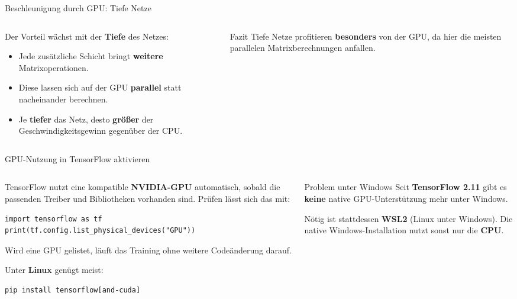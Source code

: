 \begin{frame}{Beschleunigung durch GPU: Tiefe Netze}
\begin{columns}
\begin{column}{0.60\textwidth}
Der Vorteil wächst mit der \textbf{Tiefe} des Netzes:
\begin{itemize}
\item Jede zusätzliche Schicht bringt \textbf{weitere} Matrixoperationen.
\item Diese lassen sich auf der GPU \textbf{parallel} statt nacheinander berechnen.
\item Je \textbf{tiefer} das Netz, desto \textbf{größer} der Geschwindigkeitsgewinn gegenüber der CPU.
\end{itemize}
\end{column}
\begin{column}{0.35\textwidth}
\begin{block}{Fazit}
Tiefe Netze profitieren \textbf{besonders} von der GPU, da hier die meisten parallelen Matrixberechnungen anfallen.
\end{block}
\end{column}
\end{columns}
\end{frame}


\begin{frame}[fragile]{GPU-Nutzung in TensorFlow aktivieren}
\begin{columns}
\begin{column}{0.55\textwidth}
TensorFlow nutzt eine kompatible \textbf{NVIDIA-GPU} automatisch, sobald die passenden Treiber und Bibliotheken vorhanden sind. Prüfen lässt sich das mit:
\begin{verbatim}
import tensorflow as tf
print(tf.config.list_physical_devices("GPU"))
\end{verbatim}
Wird eine GPU gelistet, läuft das Training ohne weitere Codeänderung darauf.

\vspace{0.3em}
Unter \textbf{Linux} genügt meist:
\begin{verbatim}
pip install tensorflow[and-cuda]
\end{verbatim}
\end{column}
\begin{column}{0.40\textwidth}
\begin{alertblock}{Problem unter Windows}
Seit \textbf{TensorFlow 2.11} gibt es \textbf{keine} native GPU-Unterstützung mehr unter Windows.
\end{alertblock}
Nötig ist stattdessen \textbf{WSL2} (Linux unter Windows). Die native Windows-Installation nutzt sonst nur die \textbf{CPU}.
\end{column}
\end{columns}
\end{frame}

